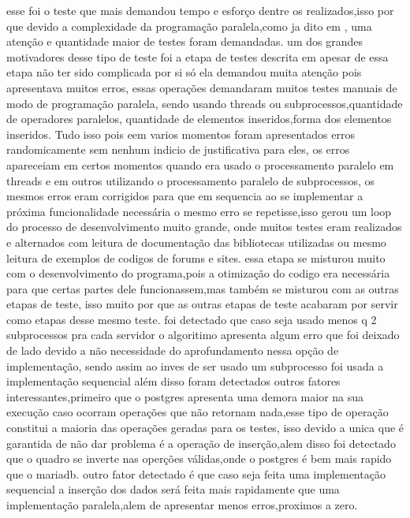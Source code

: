 \documentclass[
	12pt,				%
	openright,			%
	oneside,			%
	a4paper,			%
	english,			%
	french,				%
	spanish,			%
	brazil,				%
	]{abntex2}
\begin{document}
esse foi o teste que mais demandou tempo e esforço dentre os realizados,isso por que devido a complexidade da programação paralela,como ja dito em , uma atenção e quantidade maior de testes foram demandadas.
um dos grandes motivadores desse tipo de teste foi a etapa de testes descrita em  apesar de essa etapa não ter sido complicada por si só ela demandou muita atenção pois apresentava muitos erros,
essas operações demandaram muitos testes manuais de modo de programação paralela,
sendo usando threads ou subprocessos,quantidade de operadores paralelos,
quantidade de elementos inseridos,forma dos elementos inseridos.
Tudo isso pois eem varios momentos foram apresentados erros randomicamente sem nenhum indicio de justificativa para eles,
os erros apareceiam em certos momentos quando era usado o processamento paralelo em threads e em outros utilizando o processamento paralelo de subprocessos,
os mesmos erros eram corrigidos para que em sequencia ao se implementar a próxima funcionalidade necessária o mesmo erro se repetisse,isso gerou um loop do processo de desenvolvimento muito grande,
onde muitos testes eram realizados e alternados com leitura de documentação das bibliotecas utilizadas ou mesmo leitura de exemplos de codigos de forums e sites.
essa etapa se misturou muito com o desenvolvimento do programa,pois a otimização do codigo era necessária para que certas partes dele funcionassem,mas também se misturou com as outras etapas de teste,
isso muito por que as outras etapas de teste acabaram por servir como etapas desse mesmo teste.
foi detectado que caso seja usado menos q 2 subprocessos pra cada servidor o algoritimo apresenta algum erro que foi deixado de lado devido a não necessidade do aprofundamento nessa opção de implementação,
sendo assim ao inves de ser usado um subprocesso foi usada a implementação sequencial
além disso foram detectados outros fatores interessantes,primeiro que o postgres apresenta uma demora maior na sua execução caso ocorram operações que não retornam nada,esse tipo de operação constitui a maioria das operações geradas para os testes,
isso devido a unica que é garantida de não dar problema é a operação de inserção,alem disso foi detectado que o quadro se inverte nas operções válidas,onde o postgres é bem mais rapido que o mariadb.
outro fator detectado é que caso seja feita uma implementação sequencial a inserção dos dados será feita mais rapidamente que uma implementação paralela,alem de apresentar menos erros,proximos a zero.
\end{document}
